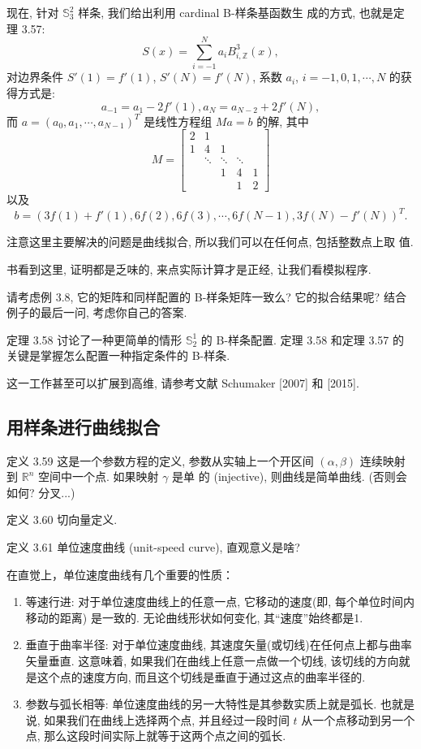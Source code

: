 \documentclass[a4paper]{ctexart}
\begin{document}
{现在, 针对 $\mathbb{S}_3^2$ 样条, 我们给出利用 cardinal B-样条基函数生
成的方式, 也就是定理 3.57:
$$
S(x) = \sum_{i = -1}^N a_i B_{i, \mathbb{Z}}^3(x),
$$
对边界条件 $S'(1) = f'(1)$, $S'(N) = f'(N)$,
系数 $a_i$, $i = -1, 0, 1, \cdots, N$ 的获得方式是:
$$
a_{-1} = a_1 - 2 f'(1), a_N = a_{N - 2} + 2 f'(N),
$$
而 $a = (a_0, a_1, \cdots, a_{N - 1})^T$ 是线性方程组 $M a = b$ 的解, 其中
$$
M = \left[
  \begin{array}{ccccc}
    2 & 1 &&& \\
    1 & 4 & 1 &&\\
    & \ddots & \ddots & \ddots & \\
    && 1 & 4 & 1\\
    &&& 1 & 2
  \end{array}
  \right]
$$
以及
$$
b = \left(3 f(1) + f'(1), 6 f(2), 6 f (3), \cdots, 6 f(N - 1), 3
f(N) - f'(N) \right)^T.
$$

注意这里主要解决的问题是曲线拟合, 所以我们可以在任何点, 包括整数点上取
值.

书看到这里, 证明都是乏味的, 来点实际计算才是正经, 让我们看模拟程序.

请考虑例 3.8, 它的矩阵和同样配置的 B-样条矩阵一致么? 它的拟合结果呢?
结合例子的最后一问, 考虑你自己的答案.

定理 3.58 讨论了一种更简单的情形 $\mathbb{S}_2^1$ 的 B-样条配置. 定理
3.58 和定理 3.57 的关键是掌握怎么配置一种指定条件的 B-样条.

这一工作甚至可以扩展到高维, 请参考文献 Schumaker [2007] 和 [2015].

\subsection{用样条进行曲线拟合}

定义 3.59 这是一个参数方程的定义, 参数从实轴上一个开区间 $(\alpha,
\beta)$ 连续映射到 $\mathbb{R}^n$ 空间中一个点. 如果映射 $\gamma$ 是单
的 (injective), 则曲线是简单曲线. (否则会如何? 分叉...)

定义 3.60 切向量定义.

定义 3.61 单位速度曲线 (unit-speed curve), 直观意义是啥? 

在直觉上，单位速度曲线有几个重要的性质：

\begin{enumerate}
  \item 等速行进: 对于单位速度曲线上的任意一点, 它移动的速度(即, 每个单位时间内移动的距离) 是一致的. 无论曲线形状如何变化, 其“速度”始终都是1.
  \item 垂直于曲率半径: 对于单位速度曲线, 其速度矢量(或切线)在任何点上都与曲率矢量垂直. 这意味着, 
  如果我们在曲线上任意一点做一个切线, 该切线的方向就是这个点的速度方向, 而且这个切线是垂直于通过这点的曲率半径的.
  \item 参数与弧长相等: 单位速度曲线的另一大特性是其参数实质上就是弧长. 也就是说, 如果我们在曲线上选择两个点, 
  并且经过一段时间 $t$ 从一个点移动到另一个点, 那么这段时间实际上就等于这两个点之间的弧长.
\end{enumerate}

}
\end{document}

